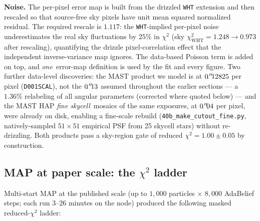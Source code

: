 \documentclass[11pt,letterpaper]{article}
\begin{document}
{\bf Noise.} The per-pixel error map is built from the drizzled
\texttt{WHT} extension and then rescaled so that source-free sky pixels
have unit mean squared normalized residual. The required rescale is
$1.117$: the \texttt{WHT}-implied per-pixel noise underestimates the
real sky fluctuations by $25\%$ in $\chi^{2}$
(sky $\chi^{2}_{\mathrm{WHT}}=1.248\to0.973$ after rescaling),
quantifying the drizzle pixel-correlation effect that the independent
inverse-variance map ignores. The data-based Poisson term is added on
top, and {\it one}\ error-map definition is used by the fit and every
figure. Two further data-level discoveries: the MAST product we model is
at $0\mbox{$\!\!\,.{}^{\prime\prime}\!\!\,$}12825$ per pixel (\texttt{D001SCAL}), not the $0\mbox{$\!\!\,.{}^{\prime\prime}\!\!\,$}13$
assumed throughout the earlier sections --- a $1.36\%$ relabeling of all
angular parameters (corrected where quoted below) --- and the MAST HAP
{\it fine skycell}\ mosaics of the same exposures, at $0\mbox{$\!\!\,.{}^{\prime\prime}\!\!\,$}04$ per
pixel, were already on disk, enabling a fine-scale rebuild
(\texttt{40b\_make\_cutout\_fine.py}, natively-sampled $51\times51$
empirical PSF from 25 skycell stars) without re-drizzling. Both products
pass a sky-region gate of reduced $\chi^{2}=1.00\pm0.05$ by
construction.

\subsection{MAP at paper scale: the $\chi^{2}$ ladder}
\label{sec:campaign-map}

Multi-start MAP at the published scale (up to $1{,}000$ particles
$\times$ $8{,}000$ AdaBelief steps; each run $3$--$26$ minutes on the
node) produced the following masked reduced-$\chi^{2}$ ladder:
\end{document}
